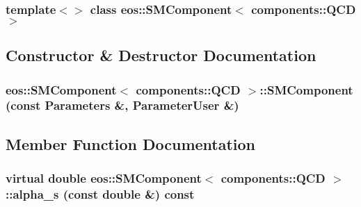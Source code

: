 \subsubsection*{template$<$$>$ class eos::SMComponent$<$ components::QCD $>$}



\subsection{Constructor \& Destructor Documentation}
\hypertarget{classeos_1_1SMComponent_3_01components_1_1QCD_01_4_a6a98003e7b150156579bb414cfffabb4}{
\subsubsection[{SMComponent}]{\setlength{\rightskip}{0pt plus 5cm}eos::SMComponent$<$ components::QCD $>$::SMComponent (const {\bf Parameters} \&, \/  {\bf ParameterUser} \&)}}
\label{classeos_1_1SMComponent_3_01components_1_1QCD_01_4_a6a98003e7b150156579bb414cfffabb4}


\subsection{Member Function Documentation}
\hypertarget{classeos_1_1SMComponent_3_01components_1_1QCD_01_4_a8f06baa780a1f99f22f2e45c9463df36}{
\subsubsection[{alpha\_\-s}]{\setlength{\rightskip}{0pt plus 5cm}virtual double eos::SMComponent$<$ components::QCD $>$::alpha\_\-s (const double \&) const}}
\label{classeos_1_1SMComponent_3_01components_1_1QCD_01_4_a8f06baa780a1f99f22f2e45c9463df36}


